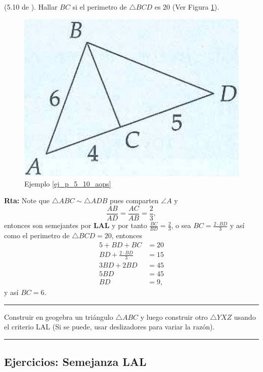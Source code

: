 \begin{ejemplo}
	(5.10 de \cite{Aops_Geometria} ). Hallar $BC$ si el perimetro de $\triangle BCD$ es 20 (Ver Figura \ref{aops_geo_p_5_10}).
\begin{figure}[H]\label{ej_p_5_10_aops}
	\centering
	\includegraphics[width=0.3\linewidth]{Geometria/imgs/aops_geo_p_5_10}
	\caption{Ejemplo \ref{ej_p_5_10_aops}}
	\label{aops_geo_p_5_10}
\end{figure}
	\textbf{Rta:} Note que $\triangle ABC \sim \triangle ADB$ pues comparten $\angle A$ y $$\frac{AB}{AD}=\frac{AC}{AB}=\frac{2}{3},$$ entonces son semejantes por \textbf{LAL} y por tanto $\frac{BC}{BD}=\frac{2}{3}$, o sea $BC=\frac{2\cdot BD}{3}$ y así como el perimetro de $\triangle BCD=20$, entonces
	\begin{equation*}
		\begin{split}
			5+BD+BC&=20\\
			BD+\frac{2\cdot BD}{3} &= 15\\
			3BD+2BD&=45\\
			5BD&=45\\
			BD&=9,
		\end{split}
	\end{equation*}
			y así $BC=6$.
\end{ejemplo}

\rule{\textwidth}{0.1mm}
\begin{act}
	Construir en geogebra un triángulo $\triangle ABC$ y luego construir otro $\triangle YXZ$ usando el criterio LAL (Si se puede, usar deslizadores para variar la razón).
\end{act}
\rule{\textwidth}{0.1mm}

\newpage
\begin{center}
	\vspace{-1cm}
	\subsection{ Ejercicios: Semejanza LAL}
\end{center}

